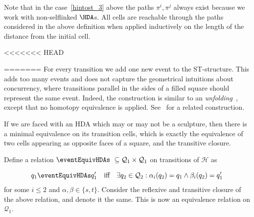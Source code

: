\begin{definition}[$\allHDA$ to $\allST$ through paths]
 
 
    \end{definition}
    
    Note that in the case~\ref{hintost_3} above the paths $\pi^{i},\pi^{j}$ always exist because we work with non-selflinked $\HDA$s. 
    All cells are reachable through the paths considered in the above definition when applied inductively on the length of the distance from the initial cell.
    
<<<<<<< HEAD
        
=======
    For every transition we add one new event to the ST-structure. This adds too many events and does not capture the geometrical intuitions about concurrency, where transitions parallel in the sides of a filled square should represent the same event. Indeed, the construction is similar to an \emph{unfolding}~\cite{Fahrenberg15PartialHDA}, except that no homotopy equivalence is applied. See~\cite[Def.~3.39]{Johansen16STstruct} for a related construction.
    
    If we are faced with an HDA which may or may not be a sculpture, then there is a minimal equivalence on its transition cells, which is exactly the equivalence of two cells appearing as opposite faces of a square, and the transitive closure.
    
    \begin{definition}
        Define a relation $\eventEquivHDAs\ \subseteq \mathcal{Q}_{1}\times \mathcal{Q}_{1}$ on transitions of $\mathcal{H}$ as 
        
        \[
            q_{1}\eventEquivHDAs q_{1}' \quad\text{iff}\quad \exists q_{2}\in
            \mathcal{Q}_{2}:\alpha_{i}(q_{2})=q_{1}\wedge \beta_{i}(q_{2})=q_{1}'
        \]
        for some $i\leq 2$ and $\alpha,\beta\in\{s,t\}$.  Consider the reflexive and transitive closure of the above relation, and denote it the same. This is now an equivalence relation on $\mathcal{Q}_{1}$.
    \end{definition}
    

